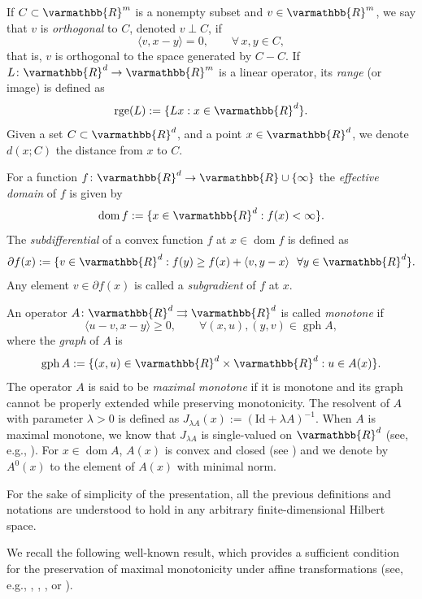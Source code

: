 \documentclass[11pt,reqno]{article}
\let\mathbb=\varmathbb
\newcommand{\R}{\mathbb{R}}
\newcommand{\dom}{\operatorname{dom}}
\newcommand{\1}{\mathds{1}}
\numberwithin{equation}{section}  %
\theoremstyle{plain}
\theoremstyle{definition}
\theoremstyle{remark}
\numberwithin{theorem}{section}
\numberwithin{remark}{section}
\numberwithin{example}{section}
\begin{document}
\noindent If $C \subset \mathbb{R}^m$ is a nonempty subset and $v \in \mathbb{R}^m$, we say that $v$ is \emph{orthogonal} to $C$, denoted $v \perp C$, if 
\[
  \langle v, x-y \rangle = 0, \qquad \forall\, x,y \in C,
\]
that is, $v$ is orthogonal to the space generated by $C - C$. If $L\colon \mathbb{R}^d \to \mathbb{R}^m$ is a linear operator, its \emph{range} (or image) is defined as
\[
    \operatorname{rge}(L) := \{ Lx : x \in \mathbb{R}^d \}.
\]
Given a set $C \subset \R^d$, and a point $x\in \R^d$, we denote  $d(x;C)$   the distance from $x$ to $C$. 

For a function $f\colon \mathbb{R}^d \to \R\cup\{\infty\}$ the \emph{effective domain} of $f$ is given by
\[
  \operatorname{dom} f := \{x \in \mathbb{R}^d : f(x) < \infty\}.
\]
The \emph{subdifferential} of a convex function $f$ at $x \in \operatorname{dom} f$ is defined as
\[
  \partial f(x) := \{ v \in \mathbb{R}^d : f(y) \geq f(x) + \langle v, y - x \rangle \ \ \forall y \in \mathbb{R}^d \}.
\]
Any element $v \in \partial f(x)$ is called a \emph{subgradient} of $f$ at $x$.  

\noindent An operator $A\colon \mathbb{R}^d \rightrightarrows \mathbb{R}^d$ is called \emph{monotone} if
\[
  \langle u-v, x-y \rangle \geq 0, \qquad \forall (x,u), (y,v) \in \operatorname{gph} A,
\]
where the \emph{graph} of $A$ is
\[
  \operatorname{gph} A := \{(x,u) \in \mathbb{R}^d \times \mathbb{R}^d : u \in A(x)\}.
\]
The operator $A$ is said to be \emph{maximal monotone} if it is monotone and its graph cannot be properly extended while preserving monotonicity.  The resolvent of $A$ with parameter $\lambda>0$ is defined as $J_{\lambda A}(x) := (\text{Id} + \lambda A)^{-1}$. When $A$ is maximal monotone, we know that $J_{\lambda A}$ is single-valued on $\R^d$ (see, e.g., \cite[Theorem 21.1]{MR3616647}). For $x\in \dom A$, $A(x)$ is convex and closed (see \cite[Proposition 20.36]{MR3616647}) and we denote by $A^0(x)$ to the element of $A(x)$ with minimal norm.

\noindent For the sake of simplicity of the presentation, all the previous definitions and notations are understood to hold in any arbitrary finite-dimensional Hilbert space.


\noindent We recall the following well-known result, which provides a sufficient condition for the preservation of maximal monotonicity under affine transformations (see, e.g., \cite[Theorem~12.43]{MR1491362}, \cite[Theorem 4]{MR2577332}, \cite[Theorem 6]{MR2160665}, or \cite[Corollary 4.4]{MR1774774}).  
\end{document}
